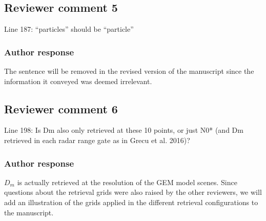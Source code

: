 \documentclass[11pt]{scrartcl}
\providecommand{\DIFadd}[1]{{\protect\textcolor{blue}{\uwave{#1}}}} %
\providecommand{\DIFdel}[1]{{\protect\textcolor{red}{\sout{#1}}}}                      %
\providecommand{\DIFaddbegin}{} %
\providecommand{\DIFaddend}{} %
\providecommand{\DIFdelbegin}{} %
\providecommand{\DIFaddFL}[1]{\DIFadd{#1}} %
\newenvironment{change}[1][]{%
  \begin{mdframed}[frametitle={Line #1:}]%
}{%
  \end{mdframed}%
}
\begin{document}

\subsection*{Reviewer comment 5}
Line 187: “particles” should be “particle”

\subsubsection*{Author response}

The sentence will be removed in the revised version of the manuscript since
the information it conveyed was deemed irrelevant.



\subsection{Reviewer comment 6}
Line 198: Is Dm also only retrieved at these 10 points, or just N0* (and Dm retrieved in each radar range gate as in Grecu et al. 2016)?

\subsubsection*{Author response}

$D_m$ is actually retrieved at the resolution of the GEM model scenes. Since
questions about the retrieval grids were also raised by the other reviewers, we
will add an illustration of the grids applied in the different retrieval
configurations to the manuscript.


\end{document}
